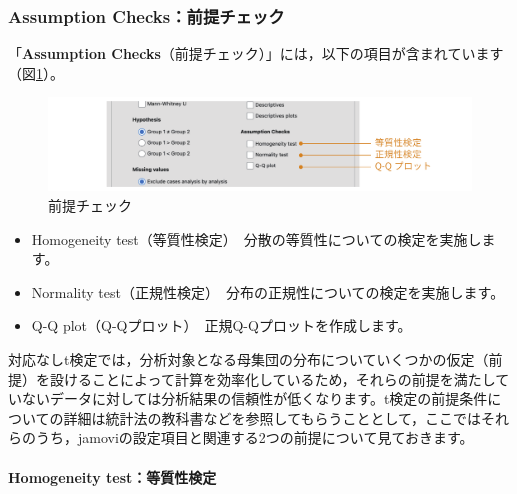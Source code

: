 \documentclass[
  12pt,
  a5jpaper,
  lualatex, ja=standard]{bxjsbook}
\providecommand{\tightlist}{%
  \setlength{\itemsep}{0pt}\setlength{\parskip}{0pt}}
\newenvironment{jmvsettings}{%
	\begin{center}%
	\begin{tcolorbox}[%
		title=設定項目,
		colframe=gmoji,
		colbacktitle=gmoji,
		colback=gmoji!2!white,
		breakable,
		width=.9\textwidth,
		]\small\addtolength{\leftmargini}{-3\labelsep}%
	}%
	{\end{tcolorbox}\end{center}}
\begin{document}
\hypertarget{subsub:ttest-assumption-checks}{%
\subsubsection*{Assumption Checks：前提チェック}\label{subsub:ttest-assumption-checks}}

「\textbf{Assumption Checks}（前提チェック）」には，以下の項目が含まれています（図\ref{fig:ttests-assumption}）。

\begin{figure}[!ht]

{\centering \includegraphics[width=1\linewidth]{images/ttests/assumption} 

}

\caption{前提チェック}\label{fig:ttests-assumption}
\end{figure}

\begin{jmvsettings}

\begin{itemize}
\tightlist
\item
  Homogeneity test（等質性検定）　分散の等質性についての検定を実施します。
\item
  Normality test（正規性検定）　分布の正規性についての検定を実施します。
\item
  Q-Q plot（Q-Qプロット）　正規Q-Qプロットを作成します。
\end{itemize}

\end{jmvsettings}

対応なしt検定では，分析対象となる母集団の分布についていくつかの仮定（前提）を設けることによって計算を効率化しているため，それらの前提を満たしていないデータに対しては分析結果の信頼性が低くなります。t検定の前提条件についての詳細は統計法の教科書などを参照してもらうこととして，ここではそれらのうち，jamoviの設定項目と関連する2つの前提について見ておきます。

\hypertarget{homogeneity-testux7b49ux8ceaux6027ux691cux5b9a}{%
\paragraph*{Homogeneity test：等質性検定}\label{homogeneity-testux7b49ux8ceaux6027ux691cux5b9a}}
\end{document}
